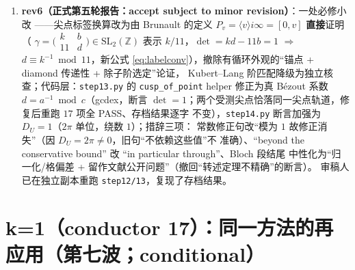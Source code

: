 \documentclass[11pt,a4paper]{ctexart}
\theoremstyle{remark}
\newcommand{\ZZ}{\mathbb{Z}}
\begin{document}
\begin{enumerate}
$H_1(X_1(11),\ZZ)\cong\ZZ^2$ 无挠、$H_1^-=\ZZ\cdot(-1,1)$、七符号链坐标 $(1,-1)$ 恰为
生成元 $\pm1$ 倍（\texttt{step13}，\texttt{notes/attack17-primitivity.txt}）；(iii) 常数
与尖点表精确化：$C_x=-1$、$C_y=+1$ 由阶 $0$ 尖点求值 + $S,T$ 变换律的单位根首项系数
精确确定，$m=(0,2,1,4,3)$ 由 Brunault 博士论文 (3.152)--(3.153) 精确导出（逆标签约定
$v\equiv k^{-1}\bmod 11$）并有 Kubert--Lang 阶唯一解的独立推导（\texttt{step14}，
\texttt{notes/attack17-constants.txt}）；\textbf{勘误}：精确计算揭示旧存档
``$D_U=D_V=0$''对 $U$ 错误——$D_U=2\pi$（绕数 $1$），修正项靠
$\log|C_x|=\log|C_y|=0$ 精确消失，\texttt{attack16} 存档已加勘误段；认证计算定理第 7
项重写；\texttt{step10} 标注为弃用缺陷实验。
\item \textbf{rev6（正式第五轮报告：accept subject to minor revision）}：一处必修小改
——尖点标签换算改为由 Brunault 的定义 $P_v=\langle v\rangle i\infty=[0,v]$
\textbf{直接}证明（
$\gamma=\bigl(\begin{smallmatrix}k&b\\11&d\end{smallmatrix}\bigr)\in\mathrm{SL}_2(\ZZ)$
表示 $k/11$，$\det=kd-11b=1$ $\Longrightarrow$ $d\equiv k^{-1}\bmod 11$，新公式
\eqref{eq:labelconv}），撤除有循环外观的``锚点 + diamond 传递性 + 除子阶选定''论证，
Kubert--Lang 阶匹配降级为独立核查；代码层：\texttt{step13.py} 的
\texttt{cusp\_of\_point} helper 修正为真 Bézout 系数 $d=a^{-1}\bmod c$（gcdex，断言
$\det=1$；两个受测尖点恰落同一尖点轨道，修复后重跑 $17$ 项全 PASS、存档结果逐字
不变），\texttt{step14.py} 断言加强为 $D_U=1$（$2\pi$ 单位，绕数 $1$）；措辞三项：
常数修正句改``模为 $1$ 故修正消失''（因 $D_U=2\pi\neq0$，旧句``不依赖这些值''不
准确）、``beyond the conservative bound'' 改 ``in particular through''、Bloch 段结尾
中性化为``归一化/格偏差 + 留作文献公开问题''（撤回``转述定理不精确''的断言）。
审稿人已在独立副本重跑 \texttt{step12/13}，复现了存档结果。
\end{enumerate}

\appendix

\section{k=1（conductor 17）：同一方法的再应用（第七波；conditional）}\label{sec:proofk1}
\end{document}
